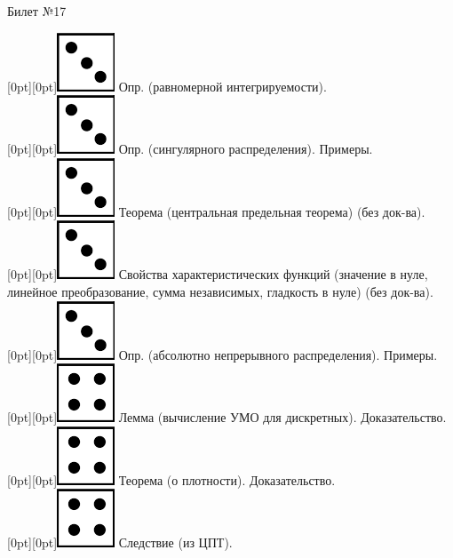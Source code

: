 \documentclass[10pt]{article}
\begin{document}
\begin{center} {\Large Билет №17} \end{center} 

\raisebox{-1pt}[0pt][0pt]{\includegraphics[width=0.02\linewidth]{3.png}} Опр. (равномерной интегрируемости). \\

\raisebox{-1pt}[0pt][0pt]{\includegraphics[width=0.02\linewidth]{3.png}} Опр. (сингулярного распределения). Примеры. \\

\raisebox{-1pt}[0pt][0pt]{\includegraphics[width=0.02\linewidth]{3.png}} Теорема (центральная предельная теорема) (без док-ва). \\

\raisebox{-1pt}[0pt][0pt]{\includegraphics[width=0.02\linewidth]{3.png}} Свойства характеристических функций (значение в нуле, линейное преобразование, сумма независимых, гладкость в нуле) (без док-ва). \\

\raisebox{-1pt}[0pt][0pt]{\includegraphics[width=0.02\linewidth]{3.png}} Опр. (абсолютно непрерывного распределения). Примеры. \\

\raisebox{-1pt}[0pt][0pt]{\includegraphics[width=0.02\linewidth]{4.png}} Лемма (вычисление УМО для дискретных). Доказательство. \\

\raisebox{-1pt}[0pt][0pt]{\includegraphics[width=0.02\linewidth]{4.png}} Теорема (о плотности). Доказательство. \\

\raisebox{-1pt}[0pt][0pt]{\includegraphics[width=0.02\linewidth]{4.png}} Следствие (из ЦПТ). \\
\end{document}
